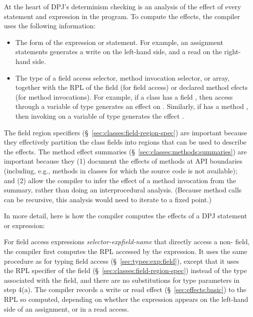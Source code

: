 At the heart of DPJ's determinism checking is an analysis of the
effect of every statement and expression in the program.  To compute
the effects, the compiler uses the following information:
%
\begin{itemize}
%
\item The form of the expression or statement.  For example,
  an assignment statements generates a write on the left-hand side,
  and a read on the right-hand side.
%
\item The type of a field access selector, method invocation selector,
  or array, together with the RPL of the field (for field access) or
  declared method efects (for method invocations).  For example, if a
  class  has a field , then access
  through a variable of type  generates an effect on
  .  Similarly, if  has a method , then invoking  on a variable of type 
  generates the effect .
%
\end{itemize}
%
The field region specifiers (\S~\ref{sec:classes:field-region-spec})
are important because they effectively partition the class fields into
regions that can be used to describe the effects.  The method effect
summaries (\S~\ref{sec:classes:methods:summaries}) are important
because they (1) document the effects of methods at API boundaries
(including, e.g., methods in classes for which the source code is not
available); and (2) allow the compiler to infer the effect of a method
invocation from the summary, rather than doing an interprocedural
analysis.  (Because method calls can be recursive, this analysis would
need to iterate to a fixed point.)

In more detail, here is how the compiler computes the effects of a
DPJ statement or expression:

 For field access expressions
\emph{selector-exp}\emph{field-name} that directly access a
non- field, the compiler first computes the RPL accessed by
the expression.  It uses the same procedure as for typing field access
(\S~\ref{sec:types:exp:field}), except that it uses the RPL specifier
of the field (\S~\ref{sec:classes:field-region-spec}) instead of the
type associated with the field, and there are no substitutions for
type parameters in step 4(a).  The compiler records a write or read
effect (\S~\ref{sec:effects:basic}) to the RPL so computed, depending
on whether the expression appears on the left-hand side of an
assignment, or in a read access.

